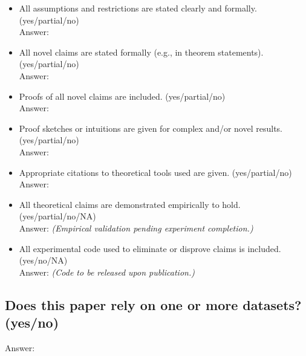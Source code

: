 \begin{itemize}
    \item All assumptions and restrictions are stated clearly and formally. (yes/partial/no)\\
    Answer: \answerYes{}
    \item All novel claims are stated formally (e.g., in theorem statements). (yes/partial/no)\\
    Answer: \answerYes{}
    \item Proofs of all novel claims are included. (yes/partial/no)\\
    Answer: \answerPartial{}
    \item Proof sketches or intuitions are given for complex and/or novel results. (yes/partial/no)\\
    Answer: \answerYes{}
    \item Appropriate citations to theoretical tools used are given. (yes/partial/no)\\
    Answer: \answerYes{}
    \item All theoretical claims are demonstrated empirically to hold. (yes/partial/no/NA)\\
    Answer: \answerNO{} \textit{(Empirical validation pending experiment completion.)}
    \item All experimental code used to eliminate or disprove claims is included. (yes/no/NA)\\
    Answer: \answerNO{} \textit{(Code to be released upon publication.)}
\end{itemize}

\subsection*{Does this paper rely on one or more datasets? (yes/no)}
Answer: \answerYes{}

